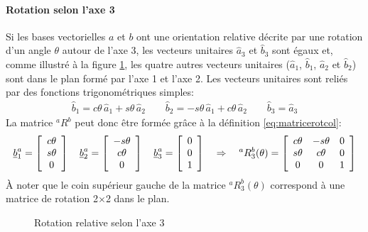 \paragraph{Rotation selon l'axe 3}
\label{sec:rot3}
%
Si les bases vectorielles $a$ et $b$ ont une orientation relative décrite par une rotation d'un angle $\theta$ autour de l'axe 3, les vecteurs unitaires $\hat{a}_3$ et $\hat{b}_3$ sont égaux et, comme illustré à la figure \ref{fig:r3vv}, les quatre autres vecteurs unitaires ($\hat{a}_1$, $\hat{b}_1$, $\hat{a}_2$ et $\hat{b}_2$) sont dans le plan formé par l'axe 1 et l'axe 2. Les vecteurs unitaires sont reliés par des fonctions trigonométriques simples:
\begin{align}
	\hat{b}_1 = c\theta \, \hat{a}_1 + s\theta \, \hat{a}_2 \quad\quad
	\hat{b}_2 = -s\theta \, \hat{a}_1 + c\theta \, \hat{a}_2 \quad\quad
	\hat{b}_3 = \hat{a}_3
	\label{eq:rot3vecuni}
\end{align}
La matrice $^aR^b$ peut donc être formée grâce à la définition \eqref{eq:matricerotcol}:
\begin{align}
	\underline{b}_1^a = \left[ \begin{array}{c} c\theta \\ s\theta \\ 0  \end{array} \right] \quad
	\underline{b}_2^a = \left[ \begin{array}{c} -s\theta \\ c\theta \\ 0  \end{array} \right] \quad
	\underline{b}_3^a = \left[ \begin{array}{c} 0 \\ 0 \\ 1  \end{array} \right]
	\quad \Rightarrow \quad
	^aR^b_3(\theta) = \left[ \begin{array}{c c c}
								 c\theta & -s\theta & 0 \\
								 s\theta & c\theta & 0 \\
								 0 & 0 & 1
	\end{array}  \right]
	\label{eq:rot3theta}
\end{align}
À noter que le coin supérieur gauche de la matrice $^aR^b_3(\theta)$ correspond à une matrice de rotation 2$\times$2 dans le plan.
%
\begin{figure}[H]
	\centering
	\hspace{+20pt}
	\caption{Rotation relative selon l'axe 3}
	\label{fig:r3vv}
\end{figure}
%

